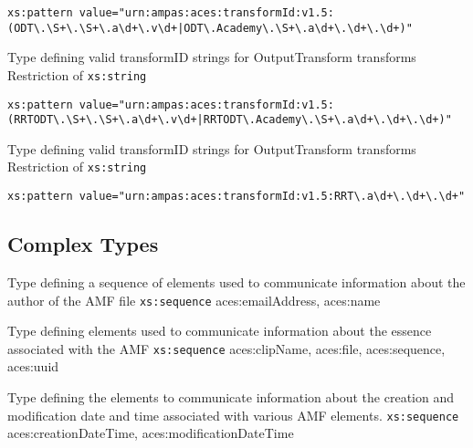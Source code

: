             \begin{adjustwidth}{5mm}{}            
            \lstinline{xs:pattern value="urn:ampas:aces:transformId:v1.5:(ODT\.\S+\.\S+\.a\d+\.v\d+|ODT\.Academy\.\S+\.a\d+\.\d+\.\d+)"}
            \end{adjustwidth}

            {Type defining valid transformID strings for OutputTransform transforms}
            {Restriction of \texttt{xs:string}}

            \begin{adjustwidth}{5mm}{}            
            \lstinline{xs:pattern value="urn:ampas:aces:transformId:v1.5:(RRTODT\.\S+\.\S+\.a\d+\.v\d+|RRTODT\.Academy\.\S+\.a\d+\.\d+\.\d+)"}
            \end{adjustwidth}

            {Type defining valid transformID strings for OutputTransform transforms}
            {Restriction of \texttt{xs:string}}
            
            \begin{adjustwidth}{5mm}{}            
            \lstinline{xs:pattern value="urn:ampas:aces:transformId:v1.5:RRT\.a\d+\.\d+\.\d+"}
            \end{adjustwidth}

\subsection{Complex Types}

            {Type defining a sequence of elements used to communicate information about the author of the AMF file}
            {\texttt{xs:sequence}}
            {aces:emailAddress, aces:name}
            
            {Type defining elements used to communicate information about the essence associated with the AMF}
            {\texttt{xs:sequence}}
            {aces:clipName, aces:file, aces:sequence, aces:uuid}
            
            {Type defining the elements to communicate information about the creation and modification date and time associated with various AMF elements.}
            {\texttt{xs:sequence}}
            {aces:creationDateTime, aces:modificationDateTime}

